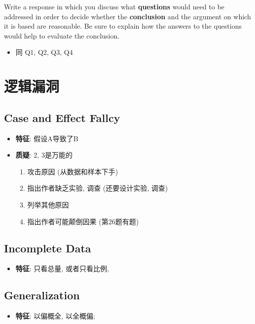     Write a response in which you discuss what \textbf{questions} would need
    to be addressed in order to decide whether the \textbf{conclusion} and the
    argument on which it is based are reasonable. Be sure to explain how the
    answers to the questions would help to evaluate the conclusion.

    \begin{itemize}
      \item 同 Q1, Q2, Q3, Q4
    \end{itemize}

\section{逻辑漏洞}

  \subsection{Case and Effect Fallcy}

    \begin{itemize}
      \item \textbf{特征}: 假设A导致了B
      \item \textbf{质疑}: 2, 3是万能的
      \begin{enumerate}
        \item 攻击原因 (从数据和样本下手)
        \item 指出作者缺乏实验, 调查 (还要设计实验, 调查)
        \item 列举其他原因
        \item 指出作者可能颠倒因果 (第26题有题)
      \end{enumerate}
    \end{itemize}

  \subsection{Incomplete Data}

    \begin{itemize}
      \item \textbf{特征}: 只看总量, 或者只看比例, 
    \end{itemize}

  \subsection{Generalization}

    \begin{itemize}
      \item \textbf{特征}: 以偏概全, 以全概偏;
    \end{itemize}

